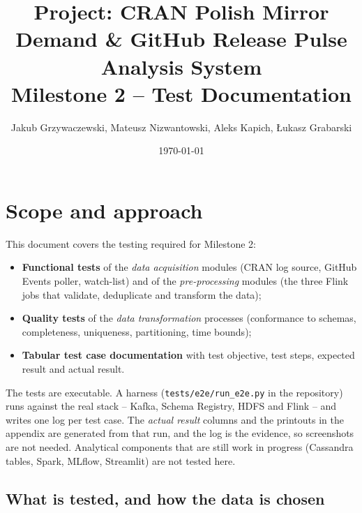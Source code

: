 \documentclass[11pt,a4paper]{article}
\title{\textbf{Project: CRAN Polish Mirror Demand \& GitHub Release Pulse Analysis System}\\[4pt]
\large Milestone 2 -- Test Documentation}
\author{Jakub Grzywaczewski, Mateusz Nizwantowski, Aleks Kapich, \L{}ukasz Grabarski}
\date{\today}
\begin{document}
\maketitle
\tableofcontents
\newpage

\section{Scope and approach}

This document covers the testing required for Milestone 2:

\begin{itemize}
  \item \textbf{Functional tests} of the \emph{data acquisition} modules (CRAN log source, GitHub Events poller, watch-list) and of the
        \emph{pre-processing} modules (the three Flink jobs that validate, deduplicate and transform the data);
  \item \textbf{Quality tests} of the \emph{data transformation} processes (conformance to schemas, completeness, uniqueness, partitioning, time bounds);
  \item \textbf{Tabular test case documentation} with test objective, test steps, expected result and actual result.
\end{itemize}

The tests are executable. A harness (\texttt{tests/e2e/run\_e2e.py} in the repository) runs against the real stack -- Kafka, Schema Registry,
HDFS and Flink -- and writes one log per test case. The \emph{actual result} columns and the printouts in the appendix are generated from that
run, and the log is the evidence, so screenshots are not needed. Analytical components that are still work in progress (Cassandra tables, Spark,
MLflow, Streamlit) are not tested here.

\subsection{What is tested, and how the data is chosen}
\end{document}
